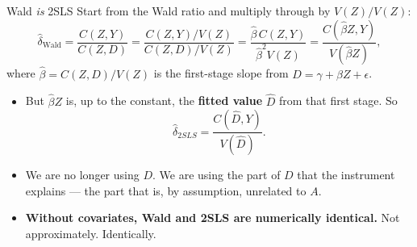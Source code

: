 \documentclass[
  11pt,
  ignorenonframetext,
  aspectratio=169,
]{beamer}
\providecommand{\tightlist}{%
  \setlength{\itemsep}{0pt}\setlength{\parskip}{0pt}}
\begin{document}
\begin{frame}{Wald \emph{is} 2SLS}
\protect{}\label{wald-is-2sls}
Start from the Wald ratio and multiply through by \(V(Z)/V(Z)\): \[
\hat\delta_{\text{Wald}}
= \frac{C(Z,Y)}{C(Z,D)}
= \frac{C(Z,Y)/V(Z)}{C(Z,D)/V(Z)}
= \frac{\hat\beta\,C(Z,Y)}{\hat\beta^{2} V(Z)}
= \frac{C(\hat\beta Z, Y)}{V(\hat\beta Z)},
\] where \(\hat\beta = C(Z,D)/V(Z)\) is the first-stage slope from
\(D = \gamma + \beta Z + \epsilon\).

\begin{itemize}
\tightlist
\item
  But \(\hat\beta Z\) is, up to the constant, the \textbf{fitted value}
  \(\hat D\) from that first stage. So \[
  \hat\delta_{2SLS} = \frac{C(\hat D, Y)}{V(\hat D)} .
  \]
\item
  We are no longer using \(D\). We are using the part of \(D\) that the
  instrument explains --- the part that is, by assumption, unrelated to
  \(A\).
\item
  \textbf{Without covariates, Wald and 2SLS are numerically identical.}
  Not approximately. Identically.
\end{itemize}
\end{frame}
\end{document}

